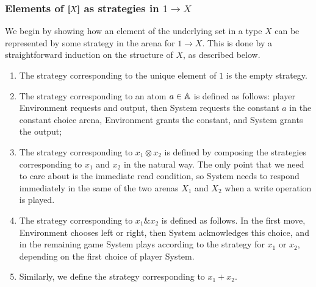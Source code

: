 \subsubsection{Elements of $[\!\![X]\!\!]$ as strategies in $1 \to X$}
\label{sec:elements-of-sem-x-as-strategies-in-1-to-x}
We begin by showing how an element of the underlying set in a type $X$ can be represented by some strategy in the arena for $1 \to X$. This is done by a straightforward induction on the structure of $X$, as described below. 

    \begin{enumerate}
        \item The strategy corresponding to the unique element of $1$ is the empty strategy.
        \item The strategy corresponding to an atom $a \in \mathbb A$ is defined as follows: player Environment requests and output, then System requests the constant $a$ in the constant choice arena, Environment grants the constant, and System grants the output;
        \item The strategy corresponding to $x_1 \otimes x_2$ is defined by composing the strategies corresponding to $x_1$ and $x_2$ in the natural way. The only point that we need to care about is the immediate read condition, so System needs to respond immediately in the same of the two arenas $X_1$ and $X_2$ when a write operation is played. 
        \item The strategy corresponding to $x_1 \& x_2$ is defined as follows. In the first move, Environment chooses left or right, then System acknowledges this choice, and in the remaining game System plays according to the strategy for $x_1$ or $x_2$, depending on the first choice of player System.
        \item Similarly, we define the strategy corresponding to $x_1 + x_2$.
    \end{enumerate}

